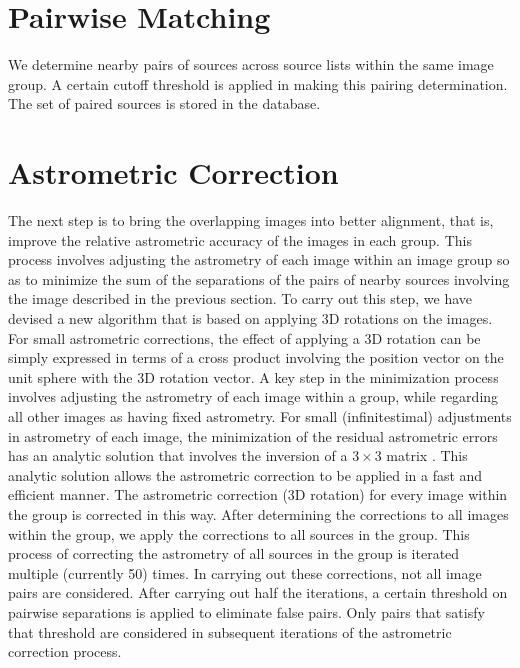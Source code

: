 \section{Pairwise Matching}

We determine nearby pairs of sources across source lists within the same image group. A certain cutoff threshold is applied in making this pairing determination. The set of paired sources is stored in the database.

\section{Astrometric Correction}

The next step is to bring the overlapping images into better alignment, that is, improve the relative astrometric accuracy of the images in each group. This process involves adjusting the astrometry of each image within an image group so as to  minimize the sum of the separations of the
pairs of nearby sources involving the image described in the previous section. To carry out this step, we have devised a new algorithm that is based
on applying 3D rotations on the images. For small astrometric corrections, the effect of applying a 3D rotation can be simply expressed in terms
of a cross product involving the position vector on the unit sphere with the 3D rotation vector. A key step in the minimization process involves adjusting the astrometry of each image within a group, while regarding all other images as having fixed astrometry. For small (infinitestimal) adjustments in astrometry of each image, the minimization of the residual astrometric errors has an analytic solution that involves the inversion of a $3 \times 3$ matrix \citep{2012arXiv1206.0644B}. This analytic solution allows the astrometric correction to be applied  in a fast and efficient manner. The astrometric correction (3D rotation) for every image within the group is corrected in this way. After determining the corrections to all images within the group, we apply the corrections  to all sources in the group. This process of correcting the astrometry of all sources in the group is iterated multiple (currently 50) times. In carrying out these corrections, not all image pairs are considered. After carrying out half the iterations, a certain threshold on pairwise separations is applied to eliminate false pairs. Only pairs that satisfy that threshold are considered in  subsequent iterations of the astrometric correction process.

